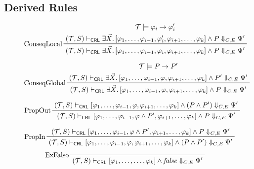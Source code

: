  \subsection{Derived Rules}\label{app:derivedRules}


 \begin{figure}
    \begin{align*}
      & \prftree[l]{ConseqLocal}
        { \prfStackPremises
          { \mathcal{T} \modelsML \varphi_i \rightarrow \varphi_i^\prime }
          { (\mathcal{T}, S) \provesCRL \exists \vec{X}.\, [\varphi_1, \ldots, \varphi_{i-1}, \varphi_i^\prime, \varphi_{i+1}, \ldots, \varphi_k] \land P \Downarrow_{C, E} \Psi^\prime}
        }
        { (\mathcal{T}, S) \provesCRL \exists \vec{X}.\, [\varphi_1, \ldots, \varphi_{i-1}, \varphi_i, \varphi_{i+1}, \ldots, \varphi_k] \land P \Downarrow_{C, E} \Psi^\prime}
    \end{align*}
  
    \begin{align*}
      & \prftree[l]{ConseqGlobal}
        { \prfStackPremises
          { \mathcal{T} \modelsML P \rightarrow P^\prime }
          { (\mathcal{T}, S) \provesCRL \exists \vec{X}.\, [\varphi_1, \ldots, \varphi_{i-1}, \varphi, \varphi_{i+1}, \ldots, \varphi_k] \land P^\prime \Downarrow_{C, E} \Psi^\prime}
        }
        { (\mathcal{T}, S) \provesCRL \exists \vec{X}.\, [\varphi_1, \ldots, \varphi_{i-1}, \varphi, \varphi_{i+1}, \ldots, \varphi_k] \land P \Downarrow_{C, E} \Psi^\prime}
    \end{align*}
  
    \begin{align*}
      & \prftree[l]{PropOut}
        { \prfStackPremises
          { (\mathcal{T}, S) \provesCRL [\varphi_1, \ldots, \varphi_{i-1}, \varphi, \varphi_{i+1}, \ldots, \varphi_k] \land (P \land P^\prime) \Downarrow_{C, E} \Psi^\prime}
        }
        { (\mathcal{T}, S) \provesCRL [\varphi_1, \ldots, \varphi_{i-1}, \varphi \land P^\prime, \varphi_{i+1}, \ldots, \varphi_k] \land P \Downarrow_{C, E} \Psi^\prime}
    \end{align*}
  
  
    \begin{align*}
      & \prftree[l]{PropIn}
        { \prfStackPremises
          { (\mathcal{T}, S) \provesCRL [\varphi_1, \ldots, \varphi_{i-1}, \varphi \land P^\prime, \varphi_{i+1}, \ldots, \varphi_k] \land P \Downarrow_{C, E} \Psi^\prime}
        }
        { (\mathcal{T}, S) \provesCRL [\varphi_1, \ldots, \varphi_{i-1}, \varphi, \varphi_{i+1}, \ldots, \varphi_k] \land (P \land P^\prime) \Downarrow_{C, E} \Psi^\prime}
    \end{align*}
    \begin{align*}
      & \prftree[l]{ExFalso}
        { (\mathcal{T}, S) \provesCRL [\varphi_1, \ldots, \ldots, \varphi_k] \land \mathit{false} \Downarrow_{C, E} \Psi^\prime}
    \end{align*}
  


\end{figure}
